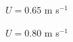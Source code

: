 \documentclass{beamer}
\begin{document}
\begin{frame}
\begin{columns}[t]
\begin{column}{0.3\paperwidth}
    \end{column}

    \begin{column}{0.3\paperwidth}

      \centering

      $U = 0.65$ m s$^{-1}$


      \vspace{1cm}

      $U = 0.80$ m s$^{-1}$


    \end{column}


  \end{columns}
  
\end{frame}
\end{document}
